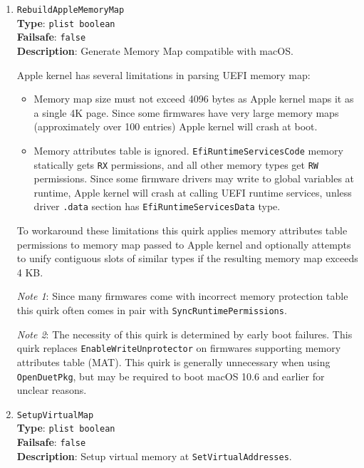\documentclass[]{article}
\providecommand{\tightlist}{%
  \setlength{\itemsep}{0pt}\setlength{\parskip}{0pt}}
\begin{document}
\begin{enumerate}
\item
  \texttt{RebuildAppleMemoryMap}\\
  \textbf{Type}: \texttt{plist\ boolean}\\
  \textbf{Failsafe}: \texttt{false}\\
  \textbf{Description}: Generate Memory Map compatible with macOS.

  Apple kernel has several limitations in parsing UEFI memory map:

  \begin{itemize}
  \tightlist
  \item Memory map size must not exceed 4096 bytes as Apple kernel maps
    it as a single 4K page. Since some firmwares have very large memory maps
    (approximately over 100 entries) Apple kernel will crash at boot.
  \item Memory attributes table is ignored. \texttt{EfiRuntimeServicesCode}
    memory statically gets \texttt{RX} permissions, and all other memory types
    get \texttt{RW} permissions. Since some firmware drivers may write to global
    variables at runtime, Apple kernel will crash at calling UEFI runtime services,
    unless driver \texttt{.data} section has \texttt{EfiRuntimeServicesData}
    type.
  \end{itemize}

  To workaround these limitations this quirk applies memory attributes table
  permissions to memory map passed to Apple kernel and optionally attempts
  to unify contiguous slots of similar types if the resulting memory map exceeds
  4 KB.

  \emph{Note 1}: Since many firmwares come with incorrect memory protection
  table this quirk often comes in pair with \texttt{SyncRuntimePermissions}.

  \emph{Note 2}: The necessity of this quirk is determined by early boot failures.
  This quirk replaces \texttt{EnableWriteUnprotector} on firmwares supporting
  memory attributes table (MAT). This quirk is generally unnecessary when using
  \texttt{OpenDuetPkg}, but may be required to boot macOS 10.6 and earlier for
  unclear reasons.

\item
  \texttt{SetupVirtualMap}\\
  \textbf{Type}: \texttt{plist\ boolean}\\
  \textbf{Failsafe}: \texttt{false}\\
  \textbf{Description}: Setup virtual memory at \texttt{SetVirtualAddresses}.


\end{enumerate}
\end{document}
